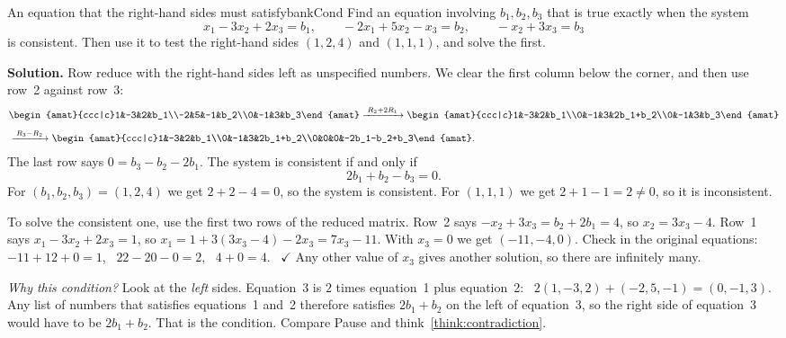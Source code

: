 \documentclass[11pt]{article}
\begin{document}
\begin{exmp}{An equation that the right-hand sides must satisfy}{bankCond}
Find an equation involving $b_1,b_2,b_3$ that is true exactly when the system
\[
x_1-3x_2+2x_3=b_1,\qquad -2x_1+5x_2-x_3=b_2,\qquad -x_2+3x_3=b_3
\]
is consistent. Then use it to test the right-hand sides $(1,2,4)$ and $(1,1,1)$, and solve the first.

\textbf{Solution.} Row reduce with the right-hand sides left as unspecified numbers. We clear the first column below the corner, and then use row~2 against row~3:
\begin{align*}
&\begin{amat}{ccc|c}1&-3&2&b_1\\-2&5&-1&b_2\\0&-1&3&b_3\end{amat}
\rops{R_2+2R_1}
\begin{amat}{ccc|c}1&-3&2&b_1\\0&-1&3&2b_1+b_2\\0&-1&3&b_3\end{amat}\\[4pt]
&
\rops{R_3-R_2}
\begin{amat}{ccc|c}1&-3&2&b_1\\0&-1&3&2b_1+b_2\\0&0&0&-2b_1-b_2+b_3\end{amat}.
\end{align*}
The last row says $0=b_3-b_2-2b_1$. The system is consistent if and only if
\[
2b_1+b_2-b_3=0.
\]
For $(b_1,b_2,b_3)=(1,2,4)$ we get $2+2-4=0$, so the system is consistent. For $(1,1,1)$ we get $2+1-1=2\neq0$, so it is inconsistent.

To solve the consistent one, use the first two rows of the reduced matrix. Row~2 says $-x_2+3x_3=b_2+2b_1=4$, so $x_2=3x_3-4$. Row~1 says $x_1-3x_2+2x_3=1$, so $x_1=1+3(3x_3-4)-2x_3=7x_3-11$. With $x_3=0$ we get $(-11,-4,0)$. Check in the original equations: \ $-11+12+0=1$, \ $22-20-0=2$, \ $4+0=4$. \ $\checkmark$ Any other value of $x_3$ gives another solution, so there are infinitely many.

\emph{Why this condition?} Look at the \emph{left} sides. Equation~3 is $2$ times equation~1 plus equation~2: \ $2(1,-3,2)+(-2,5,-1)=(0,-1,3)$. Any list of numbers that satisfies equations~1 and~2 therefore satisfies $2b_1+b_2$ on the left of equation~3, so the right side of equation~3 would have to be $2b_1+b_2$. That is the condition. Compare Pause and think~\ref{think:contradiction}.
\end{exmp}
\end{document}
